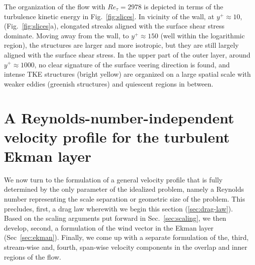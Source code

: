 \documentclass[smallcondensed,final]{svjour3}
\begin{document}
The organization of the flow with $Re_\tau=2978$ is depicted in terms of the turbulence kinetic energy in Fig.~\ref{fig:slices}.
%
In vicinity of the wall, at $y^+\approx 10$, (Fig.~\ref{fig:slices}a), elongated streaks aligned with the
surface shear stress dominate.
%
Moving away from the wall, to $y^+\approx 150$ (well within the logarithmic region), the structures
are larger and more isotropic, but they are still largely aligned with the surface shear stress.
%
In the upper part of the outer layer, around $y^+\approx 1000$, no clear signature of the
surface veering direction is found, and intense TKE structures (bright yellow)
are organized on a large spatial scale with weaker eddies (greenish structures) and quiescent regions
in between.  

\section{A Reynolds-number-independent velocity profile for the turbulent Ekman layer}
\label{sec:profiles} 
%
We now turn to the formulation of a general velocity profile that is fully determined by the only
parameter of the idealized problem, namely a Reynolds number representing the scale separation or
geometric size of the problem.
%
This precludes, first, a drag law wherewith we begin this section (\ref{sec:drag-law}).
Based on the scaling arguments put forward in Sec.~\ref{sec:scaling}, we then develop, second,
a formulation of the wind vector in the Ekman layer (Sec~\ref{sec:ekman}). Finally, we come up
with a separate formulation of the, third, stream-wise and, fourth, span-wise velocity components in the
overlap and inner regions of the flow. 
%
% 
\end{document}
